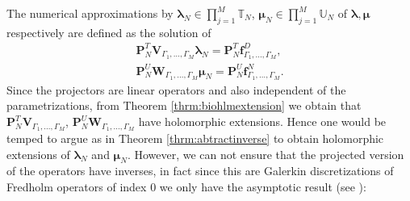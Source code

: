 \documentclass{article}
\newcommand{\bmu} {\bm{\mu}}
\newcommand{\IU}{{\mathbb U}}
\newcommand{\IT}{{\mathbb T}}
\newcommand{\bla}{\boldsymbol \lambda}
\begin{document}
  The numerical approximations by $\bla_N \in \prod_{j=1}^M \IT_N$,  $\bmu_N \in \prod_{j=1}^M \IU_N$ of $\bla, \bmu$ respectively are defined as the solution of 
 \begin{align*}
  \mathbf{P}_N^T \mathbf{V}_{\Gamma_1,\hdots,\Gamma_M} \bla_N  =   \mathbf{P}_N^T \mathbf{f}^D_{\Gamma_1,\hdots,\Gamma_M},  \\
    \mathbf{P}_N^U \mathbf{W}_{\Gamma_1,\hdots,\Gamma_M} \bmu_N  =  \mathbf{P}_N^U \mathbf{f}^N_{\Gamma_1,\hdots,\Gamma_M}.
 \end{align*}
Since the projectors are linear operators and also independent of the parametrizations, from Theorem \ref{thrm:biohlmextension} we obtain that $\mathbf{P}_N^T \mathbf{V}_{\Gamma_1,\hdots,\Gamma_M}$, $\mathbf{P}_N^U \mathbf{W}_{\Gamma_1,\hdots,\Gamma_M}$ have holomorphic extensions. Hence one would be temped to argue as in Theorem \ref{thrm:abtractinverse} to obtain holomorphic extensions of $\bla_N$ and $\bmu_N$. However, we can not ensure that the projected version of the operators have inverses, in fact since this are Galerkin discretizations of Fredholm operators of index $0$ we only have the asymptotic result (see \cite[Section 4.2.3 ]{Sauter:2011}): 
\end{document}
